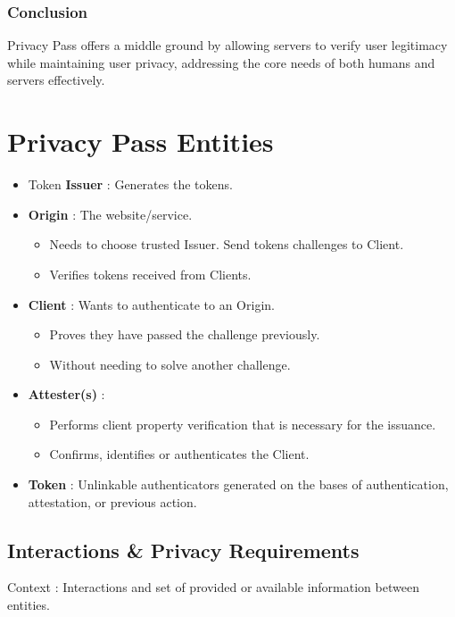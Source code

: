 \subsubsection{Conclusion}
Privacy Pass offers a middle ground by allowing servers to verify user legitimacy while maintaining user privacy, addressing the core needs of both humans and servers effectively.

\section{Privacy Pass Entities}
\begin{itemize}
    \item Token \textbf{Issuer} : Generates the tokens.
    \item \textbf{Origin} : The website/service.
    \begin{itemize}
        \item Needs to choose trusted Issuer. Send tokens challenges to Client.
        \item Verifies tokens received from Clients.
    \end{itemize}
    \item \textbf{Client} : Wants to authenticate to an Origin.
    \begin{itemize}
        \item Proves they have passed the challenge previously.
        \item Without needing to solve another challenge.
    \end{itemize}
    \item \textbf{Attester(s)} :
    \begin{itemize}
        \item Performs client property verification that is necessary for the issuance.
        \item Confirms, identifies or authenticates the Client.
    \end{itemize}
    \item \textbf{Token} : Unlinkable authenticators generated on the bases of authentication, attestation, or previous action.
\end{itemize}

\subsection{Interactions \& Privacy Requirements}
Context : Interactions and set of provided or available information between entities. 

